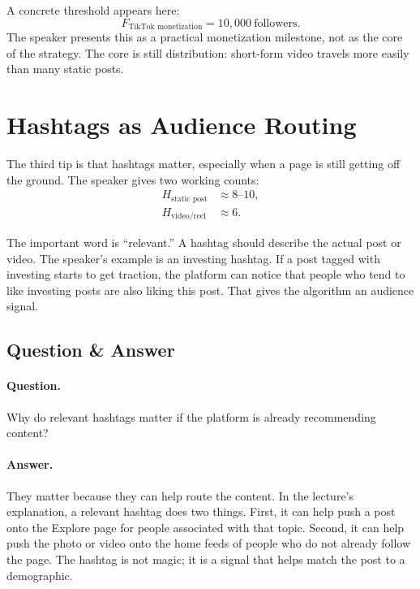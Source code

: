 A concrete threshold appears here:
\begin{equation}
F_{\text{TikTok monetization}} = 10{,}000\ \text{followers}.
\end{equation}
The speaker presents this as a practical monetization milestone, not as the core of the strategy. The core is still distribution: short-form video travels more easily than many static posts.

\section{Hashtags as Audience Routing}

The third tip is that hashtags matter, especially when a page is still getting off the ground. The speaker gives two working counts:
\begin{align}
H_{\text{static post}} &\approx 8\text{--}10,\\
H_{\text{video/reel}} &\approx 6.
\end{align}

The important word is ``relevant.'' A hashtag should describe the actual post or video. The speaker's example is an investing hashtag. If a post tagged with investing starts to get traction, the platform can notice that people who tend to like investing posts are also liking this post. That gives the algorithm an audience signal.

\subsection{Question \& Answer}

\paragraph{Question.}
Why do relevant hashtags matter if the platform is already recommending content?

\paragraph{Answer.}
They matter because they can help route the content. In the lecture's explanation, a relevant hashtag does two things. First, it can help push a post onto the Explore page for people associated with that topic. Second, it can help push the photo or video onto the home feeds of people who do not already follow the page. The hashtag is not magic; it is a signal that helps match the post to a demographic.

